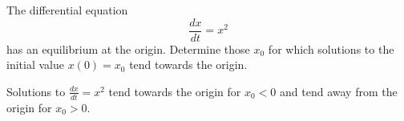 \documentclass{ximera}
\begin{document}
\begin{computerExercise} \label{c3.3.4}
The differential equation
\[
\frac{dx}{dt} =  x^2
\]
has an equilibrium at the origin.  Determine
those $x_0$ for which solutions to the initial value $x(0)=x_0$ tend
towards the origin.

\begin{solution}
Solutions to $\frac{dx}{dt} = x^2$ tend towards the origin for $x_0 < 0$
and tend away from the origin for $x_0 > 0$.
\end{solution}
\end{computerExercise}
\end{document}
